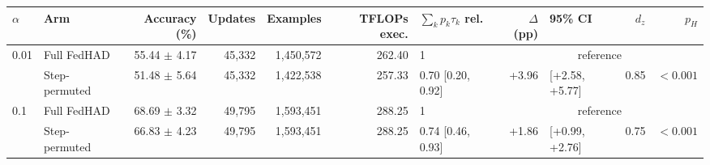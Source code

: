 \begin{tabular}{llrrrrlrlrr}
\toprule
$\alpha$ & Arm & Accuracy (\%) & Updates & Examples & TFLOPs exec. & $\sum_k p_k \tau_k$ rel. & $\Delta$ (pp) & 95\% CI & $d_z$ & $p_H$ \\
\midrule
0.01 & Full FedHAD & 55.44 $\pm$ 4.17 & 45{,}332 & 1{,}450{,}572 & 262.40 & 1 & \multicolumn{4}{c}{reference} \\
 & Step-permuted & 51.48 $\pm$ 5.64 & 45{,}332 & 1{,}422{,}538 & 257.33 & 0.70 [0.20, 0.92] & +3.96 & [+2.58, +5.77] & 0.85 & $<0.001$ \\
\midrule
0.1 & Full FedHAD & 68.69 $\pm$ 3.32 & 49{,}795 & 1{,}593{,}451 & 288.25 & 1 & \multicolumn{4}{c}{reference} \\
 & Step-permuted & 66.83 $\pm$ 4.23 & 49{,}795 & 1{,}593{,}451 & 288.25 & 0.74 [0.46, 0.93] & +1.86 & [+0.99, +2.76] & 0.75 & $<0.001$ \\
\bottomrule
\end{tabular}
